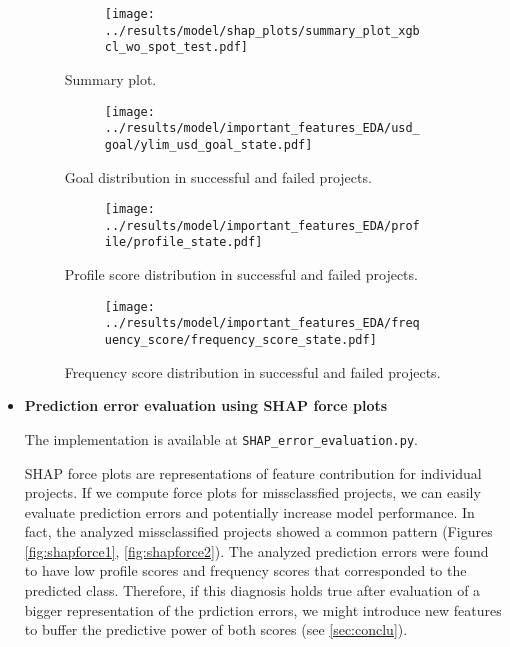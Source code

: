 \documentclass{article}
\begin{document}
\begin{itemize}
\begin{figure}
  \begin{subfigure}{1\linewidth}
    \centering\texttt{[image: ../results/model/shap\_plots/summary\_plot\_xgbcl\_wo\_spot\_test.pdf]}
  \end{subfigure}
\caption{Summary plot.}
\label{fig:shapSummary}
\end{figure}

\begin{figure}
  \begin{subfigure}{1\linewidth}
    \centering\texttt{[image: ../results/model/important\_features\_EDA/usd\_goal/ylim\_usd\_goal\_state.pdf]}
  \end{subfigure}
\caption{Goal distribution in successful and failed projects.}
\label{fig:goal}
\end{figure}

\begin{figure}
  \begin{subfigure}{1\linewidth}
    \centering\texttt{[image: ../results/model/important\_features\_EDA/profile/profile\_state.pdf]}
  \end{subfigure}
\caption{Profile score distribution in successful and failed projects.}
\label{fig:profile}
\end{figure}

\begin{figure}
  \begin{subfigure}{1\linewidth}
    \centering\texttt{[image: ../results/model/important\_features\_EDA/frequency\_score/frequency\_score\_state.pdf]}
  \end{subfigure}
\caption{Frequency score distribution in successful and failed projects.}
\label{fig:freq}
\end{figure}

\item \textbf{Prediction error evaluation using SHAP force plots}

The implementation is available at {\tt SHAP\_error\_evaluation.py}.

SHAP force plots are representations of feature contribution for individual projects. If we compute force plots for missclassfied projects, we can easily evaluate prediction errors and potentially increase model performance. In fact, the analyzed missclassified projects showed a common pattern (Figures \ref{fig:shapforce1}, \ref{fig:shapforce2}). The analyzed prediction errors were found to have low profile scores and frequency scores that corresponded to the predicted class. Therefore, if this diagnosis holds true after evaluation of a bigger representation of the prdiction errors, we might introduce new features to buffer the predictive power of both scores (see \ref{sec:conclu}).


\end{itemize}
\end{document}

